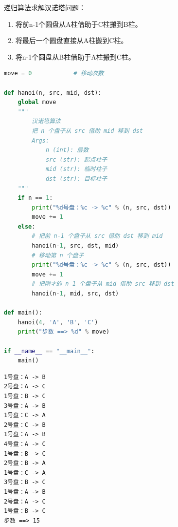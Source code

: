 递归算法求解汉诺塔问题：

\begin{enumerate}
	\item 将前n-1个圆盘从A柱借助于C柱搬到B柱。
	\item 将最后一个圆盘直接从A柱搬到C柱。
	\item 将n-1个圆盘从B柱借助于A柱搬到C柱。
\end{enumerate}

\begin{lstlisting}[language=Python]
move = 0			# 移动次数

def hanoi(n, src, mid, dst):
	global move
	"""
		汉诺塔算法
		把 n 个盘子从 src 借助 mid 移到 dst
		Args:
			n (int): 层数
			src (str): 起点柱子
			mid (str): 临时柱子
			dst (str): 目标柱子
	"""
	if n == 1:
		print("%d号盘：%c -> %c" % (n, src, dst))
		move += 1
	else:
		# 把前 n-1 个盘子从 src 借助 dst 移到 mid
		hanoi(n-1, src, dst, mid)
		# 移动第 n 个盘子
		print("%d号盘：%c -> %c" % (n, src, dst))
		move += 1
		# 把刚才的 n-1 个盘子从 mid 借助 src 移到 dst
		hanoi(n-1, mid, src, dst)

def main():
	hanoi(4, 'A', 'B', 'C')
	print("步数 ==> %d" % move)

if __name__ == "__main__":
	main()
\end{lstlisting}

\begin{tcolorbox}
	\begin{verbatim}
1号盘：A -> B
2号盘：A -> C
1号盘：B -> C
3号盘：A -> B
1号盘：C -> A
2号盘：C -> B
1号盘：A -> B
4号盘：A -> C
1号盘：B -> C
2号盘：B -> A
1号盘：C -> A
3号盘：B -> C
1号盘：A -> B
2号盘：A -> C
1号盘：B -> C
步数 ==> 15
\end{verbatim}
\end{tcolorbox}

\newpage